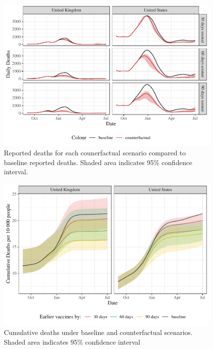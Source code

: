 \documentclass{article}
\begin{document}
\begin{figure}[H]

{\centering \includegraphics[height=0.4\textheight,]{_main_files/figure-latex/reported-deaths-averted-plot-1}

}

\caption{Reported deaths for each counerfactual scenario compared to baseline reported deaths. Shaded area indicates 95\% confidence interval.}\label{fig:reported-deaths-averted-plot}
\end{figure}

\begin{figure}[H]

{\centering \includegraphics[height=0.4\textheight,]{_main_files/figure-latex/cumulative-deaths-1}

}

\caption{Cumulative deaths under baseline and counterfactual scenarios. Shaded area indicates 95\% confidence interval}\label{fig:cumulative-deaths}
\end{figure}
\end{document}

